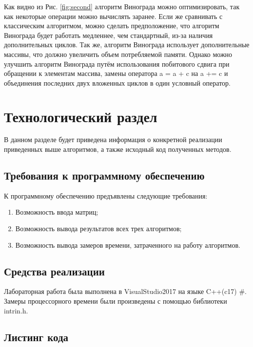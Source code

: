 \documentclass[12pt,a4paper]{scrartcl}
\begin{document}
 Как видно из Рис. \ref{fig:second} алгоритм Винограда можно оптимизировать, так как некоторые операции можно вычислять заранее. 
 Если же сравнивать с классическим алгоритмом, можно сделать предположение, что алгоритм Винограда будет работать медленнее, чем стандартный, из-за наличия дополнительных циклов. 
Так же, алгоритм Винограда использует дополнительные массивы, что должно увеличить объем потребляемой памяти.
Однако можно улучшить алгоритм Винограда путём использования побитового сдвига при обращении к элементам массива, замены оператора a = a + c на a += c и объединения последних двух вложенных циклов в один условный оператор.

\newpage
\section{Технологический раздел}
\label{sec:tech}

В данном разделе будет приведена информация о конкретной реализации приведенных выше алгоритмов, а также исходный код полученных методов.


\subsection{Требования к программному обеспечению}
\label{sec:tech:demands}

К программному обеспечению предъявлены следующие требования:
\begin{enumerate}
\item{Возможность ввода матриц;}
\item{Возможность вывода результатов всех трех алгоритмов;}
\item{Возможность вывода замеров времени, затраченного на работу алгоритмов.}
\end{enumerate}

\subsection{Средства реализации}
\label{sec:tech:relise}

Лабораторная работа была выполнена в VisualStudio2017 на языке C++(c17) \#. 
Замеры процессорного времени были произведены с помощью библиотеки intrin.h.

\subsection{Листинг кода}
\label{sec:tech:listing}
\end{document}

